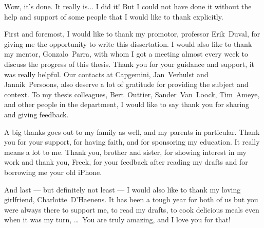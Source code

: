 \documentclass[master=cws,masteroption=se,english,a4paper,oneside]{kulemt}
\begin{document}
\begin{preface}
    Wow, it's done. It really is... I did it! But I could not have done it without the help and support of some people that I would like to thank explicitly.
    
    First and foremost, I would like to thank my promotor, professor \mbox{Erik~Duval}, for giving me the opportunity to write this dissertation. I would also like to thank my mentor, \mbox{Gonzalo Parra}, with whom I got a meeting almost every week to discuss the progress of this thesis. Thank you for your guidance and support, it was really helpful. Our contacts at Capgemini, \mbox{Jan~Verhulst} and \mbox{Jannik~Persoons}, also deserve a lot of gratitude for providing the subject and context. To my thesis colleagues, \mbox{Bert~Outtier}, \mbox{Sander~Van~Loock}, \mbox{Tim~Ameye}, and other people in the department, I would like to say thank you for sharing and giving feedback.
    
    A big thanks goes out to my family as well, and my parents in particular. Thank you for your support, for having faith, and for sponsoring my education. It really means a lot to me. Thank you, brother and sister, for showing interest in my work and thank you, Freek, for your feedback after reading my drafts and for borrowing me your old iPhone.
    
    And last --- but definitely not least --- I would also like to thank my loving girlfriend, \mbox{Charlotte~D'Haenens}. It has been a tough year for both of us but you were always there to support me, to read my drafts, to cook delicious meals even when it was my turn, \ldots\  You are truly amazing, and I love you for that!
\end{preface}

\tableofcontents*
\end{document}

